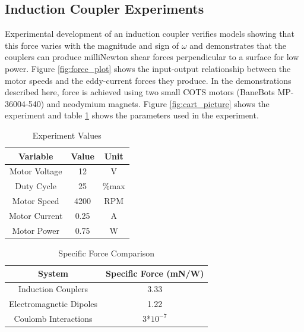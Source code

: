\subsection{Induction Coupler Experiments}
\label{sec:experiment}
Experimental development of an induction coupler verifies models showing that this force varies with the magnitude and sign of $\omega$ and demonstrates that the couplers can produce milliNewton shear forces perpendicular to a surface for low power. Figure \ref{fig:force_plot} shows the input-output relationship between the motor speeds and the eddy-current forces they produce. In the demonstrations described here, force is achieved using two small COTS motors (BaneBots MP-36004-540) and neodymium magnets. Figure \ref{fig:cart_picture} shows the experiment  and table \ref{tab:exp_vals} shows the parameters used in the experiment.

\begin{table}
\caption{\label{tab:exp_vals} Experiment Values}
\begin{ruledtabular}
\begin{tabular}{ccc}
Variable & Value & Unit \\
\hline
 Motor Voltage & 12 & V\\
 Duty Cycle & 25 & \%max\\
 Motor Speed & 4200 & RPM \\
 Motor Current & 0.25 & A \\
 Motor Power & 0.75 & W \\
\end{tabular}
\end{ruledtabular}
\end{table}

\begin{table}
\caption{\label{tab:eforce_comparison} Specific Force Comparison}
\begin{ruledtabular}
\begin{tabular}{cc}
System & Specific Force (mN/W) \\
\hline
 Induction Couplers & 3.33 \\
 Electromagnetic Dipoles & 1.22 \cite{Kong2004} \\
 Coulomb Interactions & 3*$10^{-7}$ \cite{king2002spacecraft}\\
\end{tabular}
\end{ruledtabular}
\end{table}

